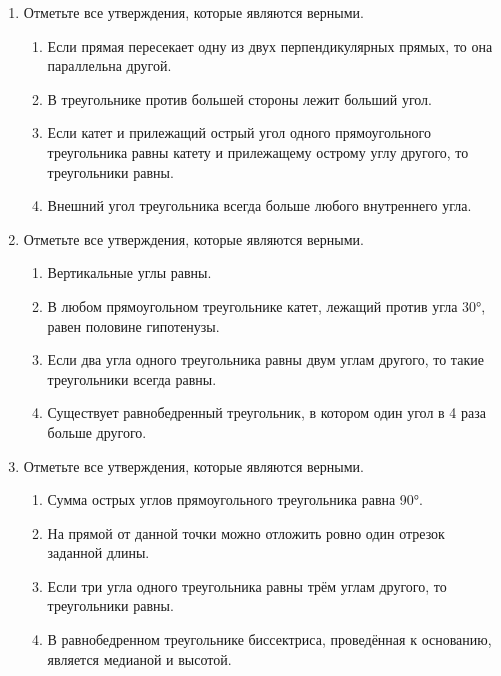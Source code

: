 \documentclass[a4paper,12pt]{article}
\newcommand{\taskspace}{\par\vspace{0.42cm}}
\begin{document}
\begin{enumerate}[resume]
\taskspace

\item Отметьте все утверждения, которые являются верными.
\begin{enumerate}[label=\arabic*),leftmargin=8mm,itemsep=0.25em,topsep=0.35em]
\item Если прямая пересекает одну из двух перпендикулярных прямых, то она параллельна другой.
\item В треугольнике против большей стороны лежит больший угол.
\item Если катет и прилежащий острый угол одного прямоугольного треугольника равны катету и прилежащему острому углу другого, то треугольники равны.
\item Внешний угол треугольника всегда больше любого внутреннего угла.
\end{enumerate}

\taskspace

\item Отметьте все утверждения, которые являются верными.
\begin{enumerate}[label=\arabic*),leftmargin=8mm,itemsep=0.25em,topsep=0.35em]
\item Вертикальные углы равны.
\item В любом прямоугольном треугольнике катет, лежащий против угла 30°, равен половине гипотенузы.
\item Если два угла одного треугольника равны двум углам другого, то такие треугольники всегда равны.
\item Существует равнобедренный треугольник, в котором один угол в 4 раза больше другого.
\end{enumerate}

\taskspace

\item Отметьте все утверждения, которые являются верными.
\begin{enumerate}[label=\arabic*),leftmargin=8mm,itemsep=0.25em,topsep=0.35em]
\item Сумма острых углов прямоугольного треугольника равна 90°.
\item На прямой от данной точки можно отложить ровно один отрезок заданной длины.
\item Если три угла одного треугольника равны трём углам другого, то треугольники равны.
\item В равнобедренном треугольнике биссектриса, проведённая к основанию, является медианой и высотой.
\end{enumerate}


\end{enumerate}
\end{document}
